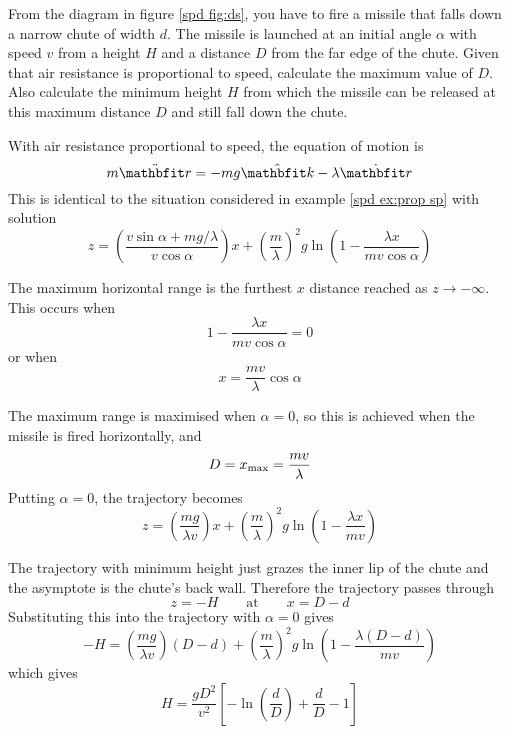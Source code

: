 \begin{example}

\problem From the diagram in figure \ref{spd fig:ds}, you have to fire a 
missile	that falls down a narrow chute of width $d$.  The missile is
launched at an initial angle $\alpha$ with speed $v$ from a height $H$ and
a distance $D$ from the far edge of the chute.  Given that air resistance is
proportional to speed, calculate the maximum value of $D$.  Also calculate
the minimum height $H$ from which the missile can be released at this
maximum distance $D$ and still fall down the chute.

\solution
With air resistance proportional to speed, the equation of motion is
$$m\ddot{\vect{r}}=-mg\kvect-\lambda \dot{\vect{r}}$$
This is identical to the situation considered in example \ref{spd ex:prop sp}
with solution
$$z=\left(\frac{v\sin\alpha+mg/\lambda}{v\cos\alpha}\right)x
+\left(\frac{m}{\lambda}\right)^2g
\ln\left(1-\frac{\lambda x}{mv\cos\alpha}\right)$$

The maximum horizontal range is the furthest $x$ distance reached as
$z\to-\infty$.  This occurs when
$$1-\frac{\lambda x}{mv\cos\alpha}=0$$
or when
$$x=\frac{mv}{\lambda}\cos\alpha$$

The maximum range is maximised when $\alpha=0$, so this is achieved when the
missile is fired horizontally, and 
$$D=x_{\rm max}=\frac{mv}{\lambda}$$
Putting $\alpha=0$, the trajectory becomes
$$z=\left(\frac{mg}{\lambda v}\right)x
+\left(\frac{m}{\lambda}\right)^2g\ln\left(1-\frac{\lambda x}{mv}\right)$$

The trajectory with minimum height just grazes the inner lip of the chute
and the asymptote is the chute's back wall.  Therefore the trajectory
passes through
$$z=-H\qquad\mbox{at}\qquad x=D-d$$
Substituting this into the trajectory with $\alpha=0$ gives
$$-H=\left(\frac{mg}{\lambda v}\right)(D-d)
+\left(\frac{m}{\lambda}\right)^2g\ln\left(1-\frac{\lambda (D-d)}{mv}\right)$$
which gives
$$H=\frac{gD^2}{v^2}\left[-\ln\left(\frac{d}{D}\right)+\frac{d}{D}-1\right]$$
\end{example}

